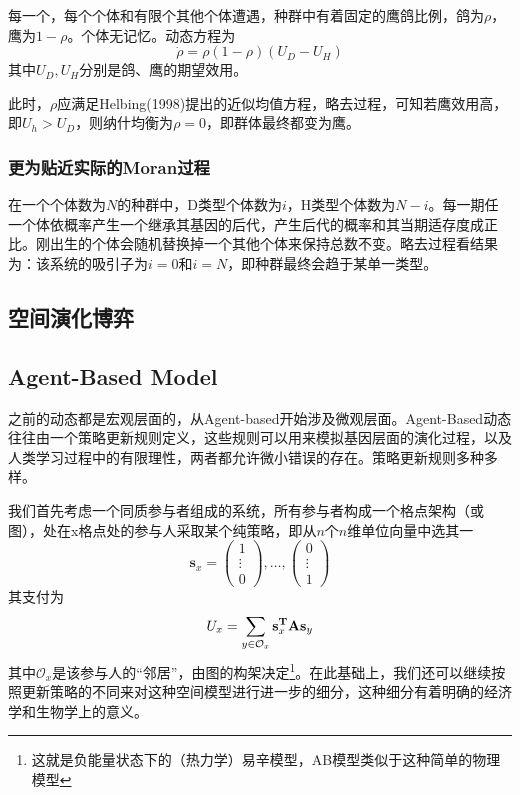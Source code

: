 \documentclass[lang=cn,12pt,a4paper]{elegantpaper}
\begin{document}
每一个，每个个体和有限个其他个体遭遇，种群中有着固定的鹰鸽比例，鸽为\(\rho\)，鹰为\(1-\rho\)。个体无记忆。动态方程为
\begin{equation}
    \dot{\rho}=\rho(1-\rho)\left(U_{D}-U_{H}\right)
\end{equation}
其中\(U_D,U_H\)分别是鸽、鹰的期望效用。

此时，\(\rho\)应满足Helbing(1998)提出的近似均值方程，略去过程，可知若鹰效用高，即\(U_h>U_D\)，则纳什均衡为\(\rho=0\)，即群体最终都变为鹰。

\subsubsection{更为贴近实际的Moran过程}

在一个个体数为\(N\)的种群中，D类型个体数为\(i\)，H类型个体数为\(N-i\)。每一期任一个体依概率产生一个继承其基因的后代，产生后代的概率和其当期适存度成正比。刚出生的个体会随机替换掉一个其他个体来保持总数不变。略去过程看结果为：该系统的吸引子为\(i=0\)和\(i=N\)，即种群最终会趋于某单一类型。

\subsection{空间演化博弈}
\subsection{Agent-Based Model}

之前的动态都是宏观层面的，从Agent-based开始涉及微观层面。Agent-Based动态往往由一个策略更新规则定义，这些规则可以用来模拟基因层面的演化过程，以及人类学习过程中的有限理性，两者都允许微小错误的存在。策略更新规则多种多样。

我们首先考虑一个同质参与者组成的系统，所有参与者构成一个格点架构（或图），处在x格点处的参与人采取某个纯策略，即从$n$个$n$维单位向量中选其一
\begin{equation}
\mathbf{s}_{x}=\left(\begin{array}{c}
1 \\
\vdots \\
0
\end{array}\right), \ldots,\left(\begin{array}{c}
0 \\
\vdots \\
1
\end{array}\right)
\end{equation}
其支付为
\begin{equation}
U_{x}=\sum_{y \in\mathcal{O}_{x}} \mathbf{s}_{x} ^{\bf{T}} \mathbf{A} \mathbf{s}_{y}
\end{equation}
其中$\mathcal{O}_x$是该参与人的“邻居”，由图的构架决定\footnote{这就是负能量状态下的（热力学）易辛模型，AB模型类似于这种简单的物理模型}。在此基础上，我们还可以继续按照更新策略的不同来对这种空间模型进行进一步的细分，这种细分有着明确的经济学和生物学上的意义。
\end{document}
